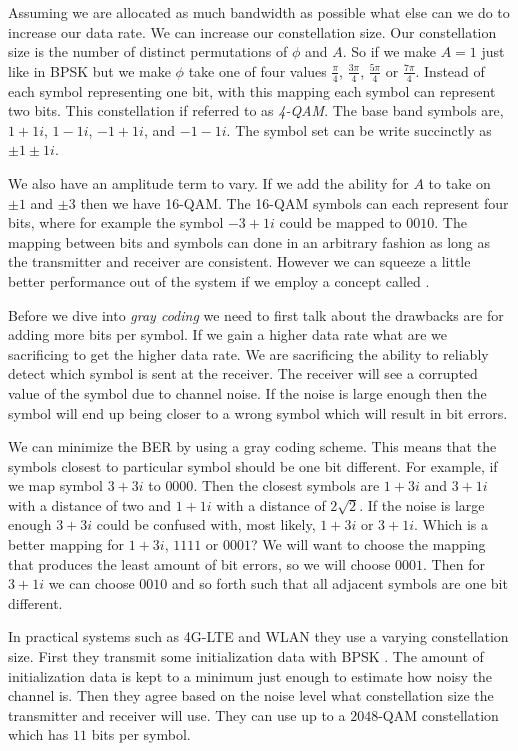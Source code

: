 Assuming we are allocated as much bandwidth as possible what else can we do to increase our data rate. We can increase our constellation size. Our constellation size is the number of distinct permutations of $\phi$ and $A$. So if we make $A=1$ just like in \ac{BPSK} but we make $\phi$ take one of four values $\frac{\pi}{4}$, $\frac{3\pi}{4}$, $\frac{5\pi}{4}$ or $\frac{7\pi}{4}$. Instead of each symbol representing one bit, with this mapping each symbol can represent two bits. This constellation if referred to as \emph{4-\ac{QAM}}. The base band symbols are, $1+1i$, $1-1i$, $-1+1i$, and $-1-1i$. The symbol set can be write succinctly as $\pm1\pm1i$.

We also have an amplitude term to vary. If we add the ability for $A$ to take on $\pm1$ and $\pm3$ then we have 16-\ac{QAM}. The 16-\ac{QAM} symbols can each represent four bits, where for example the symbol $-3+1i$ could be mapped to $0010$. The mapping between bits and symbols can done in an arbitrary fashion as long as the transmitter and receiver are consistent. However we can squeeze a little better performance out of the system if we employ a concept called \emph{}.

Before we dive into \emph{gray coding} we need to first talk about the drawbacks are for adding more bits per symbol. If we gain a higher data rate what are we sacrificing to get the higher data rate. We are sacrificing the ability to reliably detect which symbol is sent at the receiver. The receiver will see a corrupted value of the symbol due to channel noise. If the noise is large enough then the symbol will end up being closer to a wrong symbol which will result in bit errors.

We can minimize the \ac{BER} by using a gray coding scheme. This means that the symbols closest to particular symbol should be one bit different. For example, if we map symbol $3+3i$ to $0000$. Then the closest symbols are $1+3i$ and $3+1i$ with a distance of two and $1+1i$ with a distance of $2\sqrt{2}$. If the noise is large enough $3+3i$ could be confused with, most likely, $1+3i$ or $3+1i$. Which is a better mapping for $1+3i$, $1111$ or $0001$? We will want to choose the mapping that produces the least amount of bit errors, so we will choose $0001$. Then for $3+1i$ we can choose $0010$ and so forth such that all adjacent symbols are one bit different.

In practical systems such as \ac{4G-LTE} and \ac{WLAN} they use a varying constellation size. First they transmit some initialization data with \ac{BPSK} \cite{LTEBook}. The amount of initialization data is kept to a minimum just enough to estimate how noisy the channel is. Then they agree based on the noise level what constellation size the transmitter and receiver will use. They can use up to a $2048$-\ac{QAM} constellation which has $11$ bits per symbol.	
	
